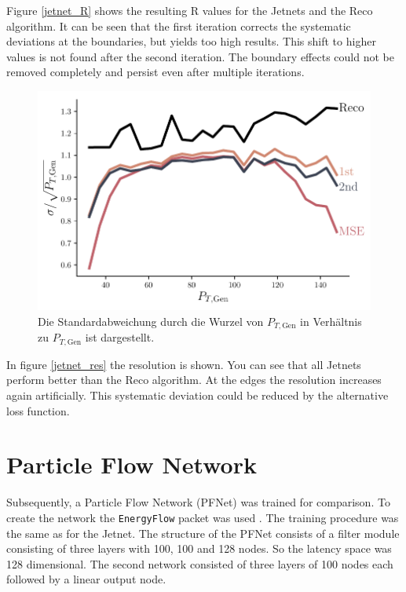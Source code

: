 \documentclass[12pt, a4paper]{thesis}
\begin{document}
Figure \ref{jetnet_R} shows the resulting R values for the Jetnets and
the Reco algorithm. It can be seen that the first iteration corrects
the systematic deviations at the boundaries, but yields too high
results. This shift to higher values is not found after the second
iteration. The boundary effects could not be removed completely and
persist even after multiple iterations.

\begin{figure}[htbp]
\centering
\includegraphics[width=.9\linewidth]{../images/jetnet_res.pdf}
\caption{\label{fig:orgd3e3a0f}
Die Standardabweichung durch die Wurzel von \(P_{T, \text{Gen}}\) in Verhältnis zu \(P_{T, \text{Gen}}\) ist dargestellt.}
\end{figure}

In figure \ref{jetnet_res} the resolution is shown. You can see that all
Jetnets perform better than the Reco algorithm. At the edges the
resolution increases again artificially. This systematic deviation
could be reduced by the alternative loss function.

\section{Particle Flow Network}
\label{sec:org307355e}

Subsequently, a Particle Flow Network (PFNet) was trained for
comparison. To create the network the \texttt{EnergyFlow} packet was used
\cite{komiske19_energ_flow_networ}. The training procedure was the same
as for the Jetnet. The structure of the PFNet consists of a filter
module consisting of three layers with 100, 100 and 128 nodes. So the
latency space was 128 dimensional. The second network consisted of
three layers of 100 nodes each followed by a linear output node.
\end{document}
